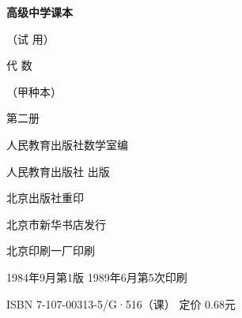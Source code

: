 \begin{titlepage}
    \begin{center}
        \vspace*{3cm}

        {\Large \textbf{高级中学课本} }

        {\Large（试 用）}

        \vspace{1cm}

        {\Huge 代 \qquad 数}

        \vspace{0.5cm}

        {\Large （甲种本）}

        {\Large 第二册}

        \vspace{1cm}
        {\Large 人民教育出版社数学室编}

        \vfill


        人民教育出版社 出版

        北京出版社重印

        北京市新华书店发行

        北京印刷一厂印刷

        1984年9月第1版  \qquad 1989年6月第5次印刷

        ISBN 7-107-00313-5/G·516（课） \quad 定价 0.68元
    \end{center}
 \end{titlepage}